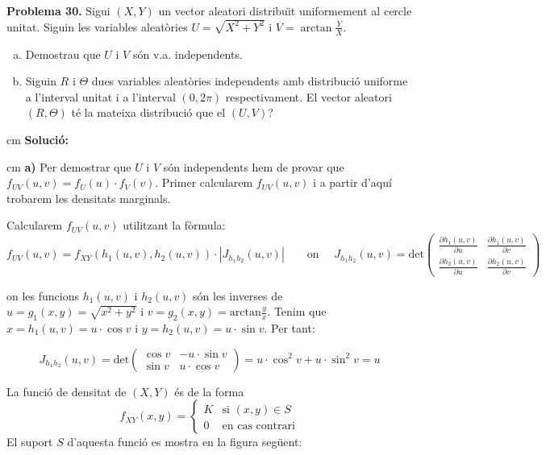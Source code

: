 \documentclass{article}
\begin{document}
\newpage
\noindent
\textbf{Problema 30.} 
Sigui $(X,Y)$ un vector aleatori distribu\"{\i}t uniformement al
cercle unitat. Siguin les variables aleat\`ories $U=\sqrt{X^2+Y^2}$
i $V=\arctan{\frac{Y}{X}}$.
\begin{enumerate}[a)]
\item Demostrau que $U$ i $V$ s\'on v.a. independents.
\item Siguin $R$ i $\Theta$ dues variables aleat\`ories independents
 amb distribuci\'o uniforme a l'interval
unitat i a l'interval $(0,2\pi)$ respectivament. El vector aleatori
$(R,\Theta)$ t\'e la mateixa distribuci\'o que el $(U,V)$? 
\end{enumerate}

 cm
\noindent
\textbf{Soluci\'o:} 

 cm
\noindent
\textbf{a)} Per demostrar que $U$ i $V$ s\'on independents hem de provar que
$f_{UV}(u, v)=f_U(u) \cdot f_V(v)$. Primer calcularem $f_{UV}(u, v)$ i a partir
d'aqu\'i trobarem les densitats marginals.

Calcularem $f_{UV}(u, v)$ utilitzant la f\`ormula:
\[
f_{UV}(u, v)=f_{XY}(h_1(u, v), h_2(u, v)) \cdot |J_{h_1h_2}(u, v)| \qquad \text{on }\quad
J_{h_1h_2}(u, v)=\mathrm{det} \begin{pmatrix} 
\frac{\partial h_1(u, v)}{\partial u} & \frac{\partial h_1(u, v)}{\partial v} \\
\frac{\partial h_2(u, v)}{\partial u} & \frac{\partial h_2(u, v)}{\partial v} 
\end{pmatrix} 
\]

\noindent
on les funcions $h_1(u, v)$ i $h_2(u, v)$ s\'on les inverses de $u=g_1(x, y)=\sqrt{x^2+y^2}$ i 
$v=g_2(x, y)=\mathrm{arctan}\frac{y}{x}$. Tenim que $x=h_1(u, v)=u \cdot \cos v$ i
$y=h_2(u, v)=u \cdot \sin v$. Per tant:

\[
J_{h_1h_2}(u, v)=\mathrm{det} \begin{pmatrix} \cos v & -u \cdot \sin v \\ \sin v & u \cdot \cos v \end{pmatrix}=
u \cdot \cos^2 v + u \cdot \sin^2 v = u
\]

\noindent
La funci\'o de densitat de $(X, Y)$ \'es de la forma
\[
f_{XY}(x, y)=\begin{cases} K & \text{si } (x, y) \in S \\ 0 & \text{en cas contrari} \end{cases}
\]
\noindent
El suport $S$ d'aquesta funci\'o es mostra en la figura seg\"uent:
\end{document}
